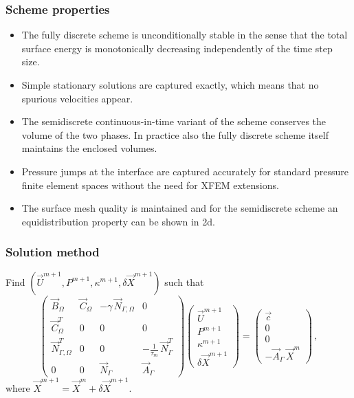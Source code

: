 \documentclass{beamer}
\newcommand{\NbulkT}{\vec{N}_{\Gamma,\Omega}^T}
\newcommand{\Nbulk}{\vec{N}_{\Gamma,\Omega}}
\begin{document}
\begin{frame}
\frametitle{Scheme properties}

\begin{itemize}
\item The fully discrete scheme is unconditionally stable in the sense that the
total surface energy is monotonically decreasing independently of the time
step size.

\pause

\item Simple stationary solutions are captured exactly, which means that no
spurious velocities appear.

\pause

\item The semidiscrete continuous-in-time variant of the scheme conserves the
volume of the two phases. In practice also the fully discrete scheme itself
maintains the enclosed volumes.

\pause

\item Pressure jumps at the interface are captured accurately for standard
pressure finite element spaces without the need for XFEM extensions.

\pause

\item The surface mesh quality is maintained and for the semidiscrete scheme an
equidistribution property can be shown in 2d.
\end{itemize}
\end{frame}

\begin{frame}
\frametitle{Solution method}

Find $(\vec U^{m+1},P^{m+1}, \kappa^{m+1},\delta\vec{X}^{m+1})$ such that
\begin{equation*}
\begin{pmatrix}
\vec B_\Omega & \vec C_\Omega & -\gamma\,\Nbulk & 0 \\
\vec C^T_\Omega & 0 & 0 & 0 \\
\NbulkT & 0 & 0 & -\frac1{\tau_m}\,\vec{N}_\Gamma^T \\
0 & 0 & \vec{N}_\Gamma & \vec{A}_\Gamma
\end{pmatrix}
\begin{pmatrix}
\vec U^{m+1} \\
P^{m+1} \\
\kappa^{m+1} \\
\delta\vec{X}^{m+1}
\end{pmatrix}
=
\begin{pmatrix}
\vec c \\
0 \\
0 \\
-\vec{A}_\Gamma\,\vec X^m
\end{pmatrix} \,,
\end{equation*}
where $\vec X^{m+1} = \vec X^m+ \delta\vec X^{m+1}$.
\end{frame}
\end{document}
